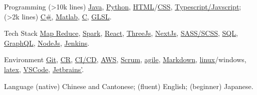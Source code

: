 
\begin{cvskills}
  \cvskill
    {Programming}
    {(>10k lines) \href{https://www.java.com/en/}{Java}, \href{https://www.python.org/}{Python}, \href{https://developer.mozilla.org/en-US/docs/Glossary/HTML5}{HTML}/\href{https://developer.mozilla.org/en-US/docs/Web/CSS}{CSS}, \href{https://www.javascript.com/}{Typescript/Javscript}; (>2k lines) \href{https://learn.microsoft.com/en-us/dotnet/csharp/tour-of-csharp/}{C\#}, \href{https://uk.mathworks.com/products/matlab.html}{Matlab}, \href{https://en.wikipedia.org/wiki/C_(programming_language)}{C}, \href{https://www.khronos.org/opengl/wiki/OpenGL_Shading_Language}{GLSL}.}

  \cvskill
    {Tech Stack} %
    {\href{https://en.wikipedia.org/wiki/MapReduce}{Map Reduce}, \href{https://spark.apache.org/}{Spark}, \href{https://reactjs.org/}{React}, \href{https://threejs.org/}{ThreeJs}, \href{https://nextjs.org/}{NextJs}, \href{https://sass-lang.com/}{SASS/SCSS}, \href{https://en.wikipedia.org/wiki/SQL}{SQL}, \href{https://graphql.org/}{GraphQL}, \href{https://nodejs.org/en/}{NodeJs}, \href{https://www.jenkins.io/}{Jenkins}.}  %



  \cvskill
    {Environment} %
    {\href{https://git-scm.com/}{Git}, \href{https://en.wikipedia.org/wiki/Code_review}{CR}, \href{https://www.redhat.com/en/topics/devops/what-is-ci-cd}{CI/CD}, \href{https://aws.amazon.com/}{AWS}, \href{https://www.scrum.org/resources/what-is-scrum}{Scrum}, \href{https://www.atlassian.com/agile}{agile}, \href{https://en.wikipedia.org/wiki/Markdown}{Markdown}, \href{https://en.wikipedia.org/wiki/Unix}{linux}/windows, \href{https://www.latex-project.org/}{latex}, \href{https://code.visualstudio.com/}{VSCode}, \href{https://www.jetbrains.com/}{Jetbrains'}.}

  \cvskill
    {Language}
    {(native) Chinese and Cantonese; (fluent) English; (beginner) Japanese.}

  
\end{cvskills}
